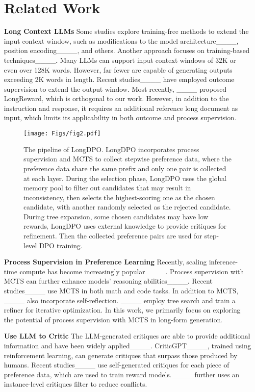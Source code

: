 \section{Related Work}
\textbf{Long Context LLMs} Some studies explore training-free methods to extend the input context window, such as modifications to the model architecture____, position encoding____, and others. Another approach focuses on training-based techniques____. Many LLMs can support input context windows of 32K or even over 128K words. However, far fewer are capable of generating outputs exceeding 2K words in length. Recent studies____ have employed outcome supervision to extend the output window. Most recently, ____ proposed LongReward, which is orthogonal to our work. However, in addition to the instruction and response, it requires an additional reference long document as input, which limits its applicability in both outcome and process supervision.



\begin{figure*}[ht]
  \centering
  \texttt{[image: Figs/fig2.pdf]}
  \caption{
The pipeline of LongDPO. LongDPO incorporates process supervision and MCTS to collect stepwise preference data, where the preference data share the same prefix and only one pair is collected at each layer. During the selection phase, LongDPO uses the global memory pool to filter out candidates that may result in inconsistency, then selects the highest-scoring one as the chosen candidate, with another randomly selected as the rejected candidate. During tree expansion, some chosen candidates may have low rewards, LongDPO uses external knowledge to provide critiques for refinement. Then the collected preference pairs are used for step-level DPO training. 
  }
  \label{fig2}
\end{figure*}


\textbf{Process Supervision in Preference Learning} %
Recently, scaling inference-time compute has become increasingly popular____. Process supervision with MCTS can further enhance models' reasoning abilities____. Recent studies____ use MCTS in both math and code tasks. In addition to MCTS, ____ also incorporate self-reflection. ____ employ tree search and train a refiner for iterative optimization. In this work, we primarily focus on exploring the potential of process supervision with MCTS in long-form generation.

\textbf{Use LLM to Critic} The LLM-generated critiques are able to provide additional information and have been widely applied____. CriticGPT____, trained using reinforcement learning, can generate critiques that surpass those produced by humans. Recent studies____ use self-generated critiques for each piece of preference data, which are used to train reward models.____ further uses an instance-level critiques filter to reduce conflicts.